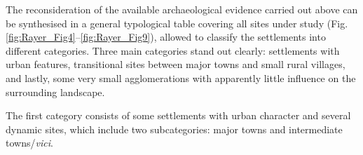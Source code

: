 The reconsideration of the available archaeological evidence carried out above can be synthesised in a general typological table covering all sites under study (Fig. \ref{fig:Rayer_Fig4}--\ref{fig:Rayer_Fig9}), allowed to classify the settlements into different categories. Three main categories stand out clearly: settlements with urban features, transitional sites between major towns and small rural villages, and lastly, some very small agglomerations with apparently little influence on the surrounding landscape.

The first category consists of some settlements with urban character and several dynamic sites, which include two subcategories: major towns and intermediate towns/\emph{vici}.

